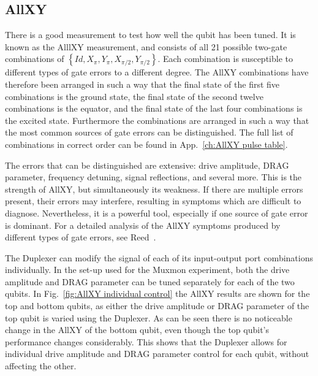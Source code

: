      \subsection{AllXY}
        \label{ssec:AllXY}
        There is a good measurement to test how well the qubit has been tuned. It is known as the AlllXY measurement, and consists of all 21 possible two-gate combinations of $\left\{Id, X_{\pi}, Y_{\pi}, X_{\pi/2}, Y_{\pi/2}\right\}$. Each combination is susceptible to different types of gate errors to a different degree. The AllXY combinations have therefore been arranged in such a way that the final state of the first five combinations is the ground state, the final state of the second twelve combinations is the equator, and the final state of the last four combinations is the excited state. Furthermore the combinations are arranged in such a way that the most common sources of gate errors can be distinguished. The full list of combinations in correct order can be found in App.~\ref{ch:AllXY pulse table}.

        The errors that can be distinguished are extensive: drive amplitude, DRAG parameter, frequency detuning, signal reflections, and several more. This is the strength of AllXY, but simultaneously its weakness. If there are multiple errors present, their errors may interfere, resulting in symptoms which are difficult to diagnose. Nevertheless, it is a powerful tool, especially if one source of gate error is dominant. For a detailed analysis of the AllXY symptoms produced by different types of gate errors, see Reed~\cite{Reed}.

        The Duplexer can modify the signal of each of its input-output port combinations individually. In the set-up used for the Muxmon experiment, both the drive amplitude and DRAG parameter can be tuned separately for each of the two qubits. In Fig.~\ref{fig:AllXY individual control} the AllXY results are shown for the top and bottom qubits, as either the drive amplitude or DRAG parameter of the top qubit is varied using the Duplexer. As can be seen there is no noticeable change in the AllXY of the bottom qubit, even though the top qubit's performance changes considerably. This shows that the Duplexer allows for individual drive amplitude and DRAG parameter control for each qubit, without affecting the other.

